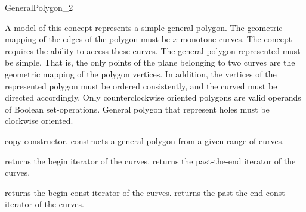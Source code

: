 \ccRefPageBegin

\begin{ccRefConcept}{GeneralPolygon_2}

\ccTypes


\ccGlue
{}

\ccDefinition
A model of this concept represents a simple general-polygon. The
geometric mapping of the edges of the polygon must be $x$-monotone curves.
The concept requires the ability to access these curves. 
The general polygon represented must be simple. That is, the
only points of the plane belonging to two curves are the geometric mapping
of the polygon vertices. In addition, the vertices of the represented 
polygon must be ordered consistently, and the curved must be directed 
accordingly. Only counterclockwise oriented polygons are valid operands
of Boolean set-operations. General polygon that represent holes must be
clockwise oriented.

\ccCreation
{}

\ccThreeToTwo

\ccGlue
{}
{copy constructor.}
\ccGlue
{}
\ccGlue
{}
{constructs a general polygon from a given range of curves.}

\ccAccessFunctions

{returns the begin iterator of the curves.}
\ccGlue
{} 
{returns the past-the-end iterator of the curves.}

{returns the begin const iterator of the curves.}
\ccGlue
{} 
{returns the past-the-end const iterator of the curves.}


\end{ccRefConcept}
